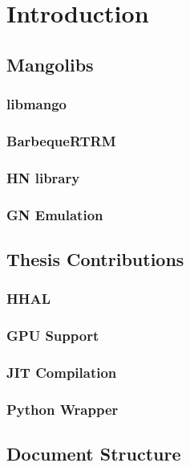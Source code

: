 \chapter{Introduction}

\section{Mangolibs}

\subsection{libmango}
\subsection{BarbequeRTRM}
\subsection{HN library}
\subsection{GN Emulation}

\section{Thesis Contributions}
\subsection{HHAL}
\subsection{GPU Support}
\subsection{JIT Compilation}
\subsection{Python Wrapper}

\section{Document Structure}


